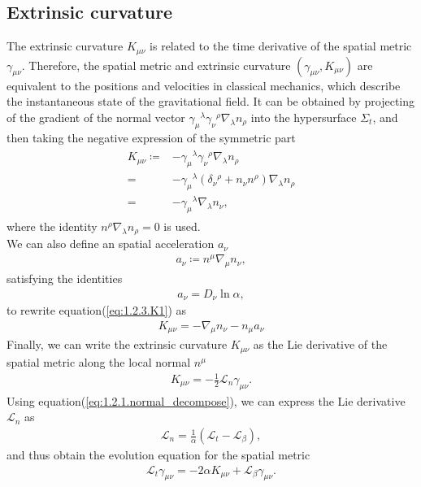 \subsection{Extrinsic curvature} \label{section1.2.3}
The extrinsic curvature $K_{\mu\nu}$ is related to the time derivative of the spatial metric $\gamma_{\mu\nu}$.
Therefore, the spatial metric and extrinsic curvature $\left(\gamma_{\mu\nu}, K_{\mu\nu} \right)$ are equivalent to the positions and velocities in classical mechanics,
which describe the instantaneous state of the gravitational field.
It can be obtained by projecting of the gradient of the normal vector $\gamma_{\mu}{}^{\lambda}\gamma_{\nu}{}^{\rho} \nabla_{\lambda} n_{\rho}$ into the hypersurface $\Sigma_t$,
and then taking the negative expression of the symmetric part
\begin{align}\label{eq:1.2.3.K1}
\begin{split}
   K_{\mu\nu} \coloneqq& - \gamma_{\mu}{}^{\lambda}\gamma_{\nu}{}^{\rho} \nabla_{\lambda} n_{\rho} \\
   =& - \gamma_{\mu}{}^{\lambda} \left( \delta_{\nu}{}^{\rho} + n_{\nu} n^{\rho} \right) \nabla_{\lambda} n_{\rho} \\
   =& - \gamma_{\mu}{}^{\lambda} \nabla_{\lambda} n_{\nu},
\end{split}
\end{align}
where the identity $n^{\rho}\nabla_{\lambda} n_{\rho}=0$ is used. \\
We can also define an spatial acceleration $a_\nu$
\begin{align}
    a_\nu \coloneqq n^\mu \nabla_\mu n_\nu,
\end{align}
satisfying the identities
\begin{align}
    a_\nu = D_\nu \ln{\alpha},
\end{align}
to rewrite equation(\ref{eq:1.2.3.K1}) as
\begin{align}
    K_{\mu\nu} = - \nabla_\mu n_\nu - n_\mu a_\nu
\end{align}
Finally, we can write the extrinsic curvature $K_{\mu\nu}$ as the Lie derivative of the spatial metric along the local normal $n^\mu$
\begin{align}
    K_{\mu\nu} = - \frac{1}{2} \mathcal{L}_{n} \gamma_{\mu\nu}.
\end{align}
Using equation(\ref{eq:1.2.1.normal_decompose}), we can express the Lie derivative $\mathcal{L}_n$ as
\begin{align}\label{eq:normal_Lie}
    \mathcal{L}_n = \frac{1}{\alpha} \left( \mathcal{L}_t - \mathcal{L}_\beta \right),
\end{align}
and thus obtain the evolution equation for the spatial metric
\begin{align}\label{eq:g_evol}
    \mathcal{L}_t \gamma_{\mu\nu} = - 2\alpha K_{\mu\nu} + \mathcal{L}_\beta \gamma_{\mu\nu}.
\end{align}

